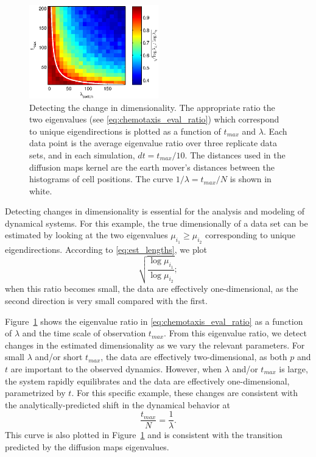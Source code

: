 \begin{figure}[t]
%
\centering
\includegraphics[width=0.5\textwidth]{tmax_lambda_transition}
%
\caption{Detecting the change in dimensionality. The appropriate ratio the two eigenvalues (see \eqref{eq:chemotaxis_eval_ratio}) which correspond to unique eigendirections is plotted as a function of $t_{max}$ and $\lambda$. Each data point is the average eigenvalue ratio over three replicate data sets, and in each simulation, $dt=t_{max}/10$. The distances used in the diffusion maps kernel are the earth mover's distances between the histograms of cell positions. The curve $1/\lambda = t_{max}/N$ is shown in white. }
%
\label{fig:chemotaxis_compare_timescales_evals}
%
\end{figure}

Detecting changes in dimensionality is essential for the analysis and modeling of dynamical systems.
%
For this example, the true dimensionally of a data set can be estimated by looking at the two eigenvalues $\mu_{i_1} \ge \mu_{i_2}$ corresponding to unique eigendirections.
%
According to \eqref{eq:est_lengths}, we plot
\begin{equation}\label{eq:chemotaxis_eval_ratio}
 \sqrt{\frac{\log \mu_{i_1}}{\log \mu_{i_2}}} ;
\end{equation}
when this ratio becomes small, the data are effectively one-dimensional, as the second direction is very small compared with the first.

Figure~\ref{fig:chemotaxis_compare_timescales_evals} shows the eigenvalue ratio in \eqref{eq:chemotaxis_eval_ratio} as a function of $\lambda$ and the time scale of observation $t_{max}$.
%
From this eigenvalue ratio, we detect changes in the estimated dimensionality as we vary the relevant parameters.
%
For small $\lambda$ and/or short $t_{max}$, the data are effectively two-dimensional, as both $p$ and $t$ are important to the observed dynamics.
%
However, when $\lambda$ and/or $t_{max}$ is large, the system rapidly equilibrates and the data are effectively one-dimensional, parametrized by $t$.
%
For this specific example, these changes are consistent with the analytically-predicted shift in the dynamical behavior at
\begin{equation}
\frac{t_{max}}{N} = \frac{1}{\lambda}.
\end{equation}
%
This curve is also plotted in Figure~\ref{fig:chemotaxis_compare_timescales_evals} and is consistent with the transition predicted by the diffusion maps eigenvalues.

